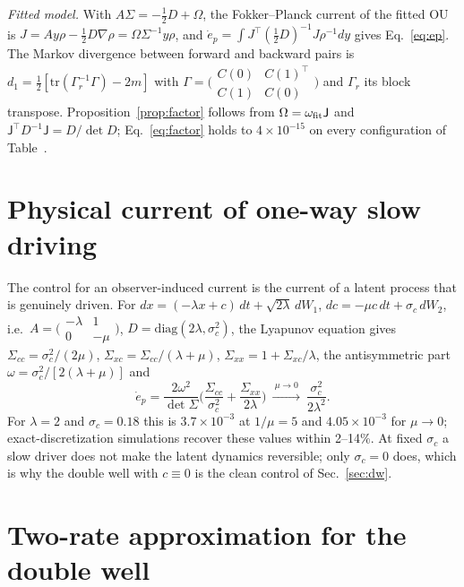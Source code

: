 \emph{Fitted model.} With $A\Sigma=-\tfrac12D+\Omega$, the Fokker--Planck current of the fitted OU is $J=Ay\rho-\tfrac12D\nabla\rho=\Omega\Sigma^{-1}y\rho$, and $\dot e_p=\int J^\top(\tfrac12D)^{-1}J\rho^{-1}dy$ gives Eq.~\eqref{eq:ep}. The Markov divergence between forward and backward pairs is $d_1=\tfrac12[\mathrm{tr}(\Gamma_r^{-1}\Gamma)-2m]$ with $\Gamma=\bigl(\begin{smallmatrix}C(0)&C(1)^\top\\C(1)&C(0)\end{smallmatrix}\bigr)$ and $\Gamma_r$ its block transpose. Proposition~\ref{prop:factor} follows from $\Omega=\omega_{\rm fit}\mathsf J$ and $\mathsf J^\top D^{-1}\mathsf J=D/\det D$; Eq.~\eqref{eq:factor} holds to $4\times10^{-15}$ on every configuration of Table~.

\section{Physical current of one-way slow driving}\label{app:oneway}

The control for an observer-induced current is the current of a latent process that is genuinely driven. For $dx=(-\lambda x+c)\,dt+\sqrt{2\lambda}\,dW_1$, $dc=-\mu c\,dt+\sigma_c\,dW_2$, i.e.\ $A=\bigl(\begin{smallmatrix}-\lambda&1\\0&-\mu\end{smallmatrix}\bigr)$, $D=\mathrm{diag}(2\lambda,\sigma_c^2)$, the Lyapunov equation gives $\Sigma_{cc}=\sigma_c^2/(2\mu)$, $\Sigma_{xc}=\Sigma_{cc}/(\lambda+\mu)$, $\Sigma_{xx}=1+\Sigma_{xc}/\lambda$, the antisymmetric part $\omega=\sigma_c^2/[2(\lambda+\mu)]$ and
\begin{equation}
\dot e_p=\frac{2\omega^2}{\det\Sigma}\Big(\frac{\Sigma_{cc}}{\sigma_c^2}+\frac{\Sigma_{xx}}{2\lambda}\Big)\ \xrightarrow{\ \mu\to0\ }\ \frac{\sigma_c^2}{2\lambda^2}.
\end{equation}
For $\lambda=2$ and $\sigma_c=0.18$ this is $3.7\times10^{-3}$ at $1/\mu=5$ and $4.05\times10^{-3}$ for $\mu\to0$; exact-discretization simulations recover these values within 2--14\%. At fixed $\sigma_c$ a slow driver does not make the latent dynamics reversible; only $\sigma_c=0$ does, which is why the double well with $c\equiv0$ is the clean control of Sec.~\ref{sec:dw}.

\section{Two-rate approximation for the double well}\label{app:tworate}

